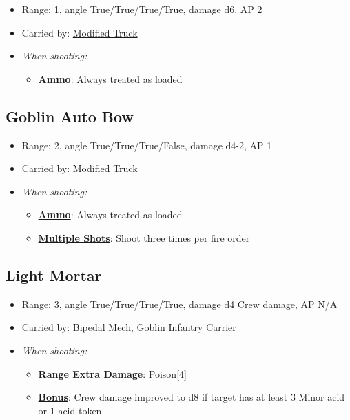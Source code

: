 \documentclass[a4paper,12pt]{article}
\begin{document}
\begin{itemize}
\item Range: 1, angle True/True/True/True, damage d6, AP 2
\item Carried by: \hyperref[model-modified-truck]{Modified Truck}
\item \textit{When shooting:}
\begin{itemize}
\item \textbf{\hyperref[rule-special-ammo]{Ammo}}: Always treated as loaded

\end{itemize}






\end{itemize}

\subsection{Goblin Auto Bow}
\label{equipment-goblin-auto-bow}

\begin{itemize}
\item Range: 2, angle True/True/True/False, damage d4-2, AP 1
\item Carried by: \hyperref[model-modified-truck]{Modified Truck}
\item \textit{When shooting:}
\begin{itemize}
\item \textbf{\hyperref[rule-special-ammo]{Ammo}}: Always treated as loaded
\item \textbf{\hyperref[rule-special-multiple-shots]{Multiple Shots}}: Shoot three times per fire order

\end{itemize}






\end{itemize}

\subsection{Light Mortar}
\label{equipment-light-mortar}

\begin{itemize}
\item Range: 3, angle True/True/True/True, damage d4 Crew damage, AP N/A
\item Carried by: \hyperref[model-bipedal-mech]{Bipedal Mech}, \hyperref[model-goblin-infantry-carrier]{Goblin Infantry Carrier}
\item \textit{When shooting:}
\begin{itemize}
\item \textbf{\hyperref[rule-special-range-extra-damage]{Range Extra Damage}}: Poison[4]
\item \textbf{\hyperref[rule-special-bonus]{Bonus}}: Crew damage improved to d8 if target has at least 3 Minor acid or 1 acid token

\end{itemize}






\end{itemize}
\end{document}
